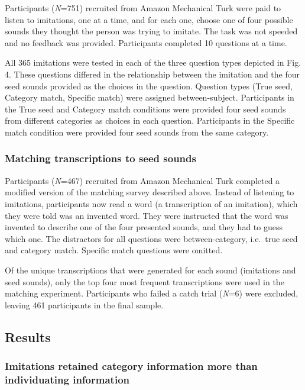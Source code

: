 \documentclass[english,floatsintext,man]{apa6}
\theoremstyle{definition}
\theoremstyle{definition}
\theoremstyle{definition}
\theoremstyle{remark}
\begin{document}
Participants (\emph{N}=751) recruited from Amazon Mechanical Turk were
paid to listen to imitations, one at a time, and for each one, choose
one of four possible sounds they thought the person was trying to
imitate. The task was not speeded and no feedback was provided.
Participants completed 10 questions at a time.

All 365 imitations were tested in each of the three question types
depicted in Fig. 4. These questions differed in the relationship between
the imitation and the four seed sounds provided as the choices in the
question. Question types (True seed, Category match, Specific match)
were assigned between-subject. Participants in the True seed and
Category match conditions were provided four seed sounds from different
categories as choices in each question. Participants in the Specific
match condition were provided four seed sounds from the same category.

\hypertarget{matching-transcriptions-to-seed-sounds}{%
\subsubsection{Matching transcriptions to seed
sounds}\label{matching-transcriptions-to-seed-sounds}}

Participants (\emph{N}=467) recruited from Amazon Mechanical Turk
completed a modified version of the matching survey described above.
Instead of listening to imitations, participants now read a word (a
transcription of an imitation), which they were told was an invented
word. They were instructed that the word was invented to describe one of
the four presented sounds, and they had to guess which one. The
distractors for all questions were between-category, i.e.~true seed and
category match. Specific match questions were omitted.

Of the unique transcriptions that were generated for each sound
(imitations and seed sounds), only the top four most frequent
transcriptions were used in the matching experiment. Participants who
failed a catch trial (\emph{N}=6) were excluded, leaving 461
participants in the final sample.

\hypertarget{results-1}{%
\subsection{Results}\label{results-1}}

\hypertarget{imitations-retained-category-information-more-than-individuating-information}{%
\subsubsection{Imitations retained category information more than
individuating
information}\label{imitations-retained-category-information-more-than-individuating-information}}
\end{document}
